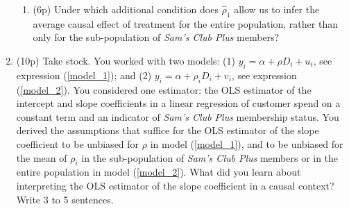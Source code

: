 \documentclass{article}
\begin{document}
\begin{enumerate}[label=\textbf{Q\arabic{enumi}}.,ref=Q\arabic{enumi}, wide=0pt, itemsep=1em, topsep=5pt]
\begin{enumerate}
\item (6p) Under which additional condition does $\widehat{\rho}_1$ allow us to infer the average causal effect of treatment for the entire population, rather than only for the sub-population of \textit{Sam's Club Plus} members?

    \end{enumerate}
    
  
    \item (10p) Take stock. You worked with two models: (1) $y_{i}=\alpha +\rho D_{i}+u _{i}$, see expression (\ref{model_1}); and (2) $y_{i}=\alpha +\rho _{i}D_{i}+v_{i}$, see expression (\ref{model_2}). You considered one estimator: the OLS estimator of the intercept and slope coefficients in a linear regression of customer spend on a constant term and an indicator of \textit{Sam's Club Plus} membership status. You derived the assumptions that suffice for the OLS estimator of the slope coefficient to be unbiased for $\rho$ in model (\ref{model_1}), and to be unbiased for the mean of $\rho _{i}$ in the sub-population of \textit{Sam's Club Plus}  members or in the entire population in model (\ref{model_2}). What did you learn about interpreting the OLS estimator of the slope coefficient in a causal context? Write 3 to 5 sentences.
\end{enumerate}
\end{document}
